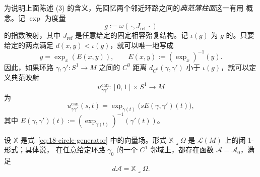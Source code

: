 为说明上面陈述 (3) 的含义，先回忆两个邻近环路之间的\emph{典范薄柱面}这一有用
概念。记 $\exp$ 为度量
\[
 g:=\omega(\,\cdot,J_{\mathrm{ref}}\,\cdot)
\]
的指数映射，其中 $J_{\mathrm{ref}}$ 是任意给定的固定相容殆复结构。记
$\iota(g)$ 为 $g$ 的\termInjectivityRadius{}。只要给定的两点满足
$d(x,y)<\iota(g)$，就可以唯一地写成
\[
 y=\exp_x(E(x,y)),\qquad E(x,y):=(\exp_x)^{-1}(y).
\]
因此，如果环路 $\gamma,\gamma':S^1\to M$ 之间的 $C^0$ 距离
$d_{C^0}(\gamma,\gamma')$ 小于 $\iota(g)$，就可以定义典范映射
\[
 u^{\mathrm{can}}_{\gamma\gamma'}:[0,1]\times S^1\longrightarrow M
\]
为
\begin{equation}
 u^{\mathrm{can}}_{\gamma\gamma'}(s,t)
 =\exp_{\gamma(t)}\bigl(sE(\gamma,\gamma')(t)\bigr),
 \label{eq:18-canonical-thin-cylinder}
\end{equation}
其中 $E(\gamma,\gamma')(t):=(\exp_{\gamma(t)})^{-1}(\gamma'(t))$。

\begin{lemma}
\label{lem:18-action-one-form-locally-exact}
设 $\mathbb X$ 是式~\eqref{eq:18-circle-generator} 中的向量场。形式
$\mathbb X\mathbin{\lrcorner}\Omega$ 是 $\mathcal L(M)$ 上的闭 1-形式；具体说，
在任意给定环路 $\gamma_0$ 的一个 $C^1$ 邻域上，都存在函数
$\mathcal A=\mathcal A_0$，满足
\begin{equation}
 d\mathcal A=\mathbb X\mathbin{\lrcorner}\Omega.
 \label{eq:18-local-action-primitive}
\end{equation}
\end{lemma}

